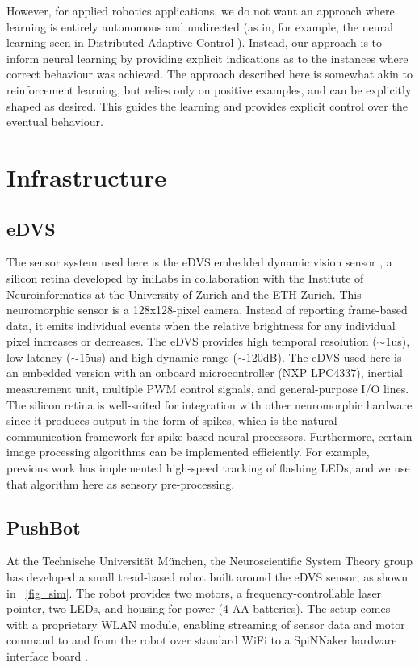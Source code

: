 \documentclass[conference]{IEEEtran}
\begin{document}
However, for applied robotics applications, we do not want an approach where
learning is entirely autonomous and undirected (as in, for example, the neural
learning seen in Distributed Adaptive Control \cite{verschure2012distributed}). 
Instead, our approach is to inform neural learning by providing explicit
indications as to the instances where correct behaviour was achieved.  The 
approach described here is somewhat akin to reinforcement learning, but relies
only on positive examples, and can be explicitly shaped as desired.  This 
guides the learning and provides explicit control over the eventual behaviour. 

\section{Infrastructure}
\label{infrastructure}

\subsection{eDVS}
The sensor system used here is the eDVS embedded dynamic vision 
sensor \cite{conradt2009embedded}, a silicon retina developed by iniLabs in 
collaboration with the Institute of Neuroinformatics at the University of 
Zurich and the ETH Zurich. This neuromorphic sensor is a 128x128-pixel camera. 
Instead of reporting frame-based data, it emits individual events when the 
relative brightness for any individual pixel increases or decreases. The eDVS 
provides high temporal resolution ($\sim$1us), low latency ($\sim$15us) and high dynamic 
range ($\sim$120dB). The eDVS used here is an embedded version with an onboard 
microcontroller (NXP LPC4337), inertial measurement unit, multiple PWM control 
signals, and general-purpose I/O lines. The silicon retina is well-suited for 
integration with other neuromorphic hardware since it produces output in the 
form of spikes, which is the natural communication framework for spike-based 
neural processors. Furthermore, certain image processing algorithms can be 
implemented efficiently. For example, previous work \cite{muller2011miniature} 
has implemented high-speed tracking of flashing LEDs, and we use that algorithm 
here as sensory pre-processing.


\subsection{PushBot}
At the Technische Universit{\"a}t M{\"u}nchen, the Neuroscientific
System Theory group has developed a small tread-based robot built around the 
eDVS sensor, as shown in \figurename~\ref{fig_sim}. The robot provides two motors, a frequency-controllable laser pointer, two LEDs, and housing for power (4 AA batteries). The setup comes with a proprietary WLAN module, enabling streaming of sensor data and motor command to and from the robot over standard WiFi to a SpiNNaker hardware interface board \cite{denk2013}.
\end{document}

